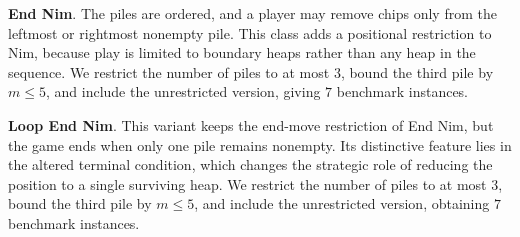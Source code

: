 \documentclass[review]{elsarticle}
\newcommand{\set}[1]{\{ #1 \}}
\newcommand{\tuple}[1]{\langle {#1} \rangle}
\newcommand{\true}{\top}
\newcommand{\statevar}{\mathcal{X}}
\newcommand{\act}{\mathcal{A}}
\newcommand{\constraint}{\mathcal{C}}
\newcommand{\estate}{\mathcal{E}}
\newcommand{\pre}{\mathtt{pre}}
\newcommand{\eff}{\mathtt{eff}}
\begin{document}
\textbf{End Nim}. The piles are ordered, and a player may remove chips only from the leftmost or rightmost nonempty pile.
This class adds a positional restriction to Nim, because play is limited to boundary heaps rather than any heap in the sequence.
We restrict the number of piles to at most $3$, bound the third pile by $m \le 5$, and include the unrestricted version, giving $7$ benchmark instances.

\textbf{Loop End Nim}. This variant keeps the end-move restriction of End Nim, but the game ends when only one pile remains nonempty.
Its distinctive feature lies in the altered terminal condition, which changes the strategic role of reducing the position to a single surviving heap.
We restrict the number of piles to at most $3$, bound the third pile by $m \le 5$, and include the unrestricted version, obtaining $7$ benchmark instances.
\end{document}
